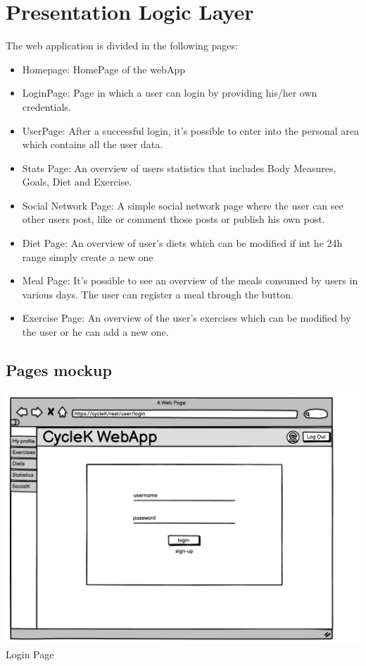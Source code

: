 \section{Presentation Logic Layer}


The web application is divided in the following pages:
\begin{itemize}
    \item Homepage: HomePage of the webApp
    \item LoginPage: Page in which a user can login by providing his/her own credentials.
    \item UserPage: After a successful login, it’s possible to enter into the personal area which contains all the user data.
    \item Stats Page: An overview of users statistics that includes Body Measures, Goals, Diet and Exercise.
    \item Social Network Page: A simple social network page where the user can see other users post, like or comment those posts or publish his own post.
    \item Diet Page: An overview of user's diets which can be modified if int he 24h range simply create a new one
    \item Meal Page: It's possible to see an overview of the meals consumed by users in various days. The user can register a meal through the button.
    \item Exercise Page: An overview of the user's exercises which can be modified by the user or he can add a new one.
\end{itemize}

\subsection{Pages mockup}

\begin{center}
\includegraphics[scale=0.47]{Resources/Mockup/LoginPage.pdf}\\
Login Page
\end{center}

